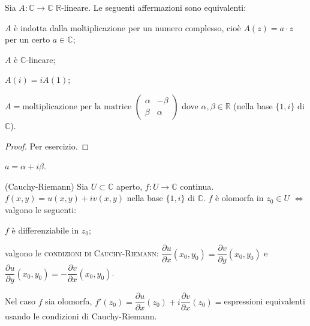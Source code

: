 \begin{lm} \label{c-lineare}
  Sia $A: \mathbb{C} \longrightarrow \mathbb{C}$ $\mathbb{R}$-lineare. Le seguenti affermazioni sono equivalenti:
  \begin{nlist}
    \item $A$ è indotta dalla moltiplicazione per un numero complesso, cioè $A(z)=a \cdot z$ per un certo $a \in \mathbb{C}$;
    \item $A$ è $\mathbb{C}$-lineare;
    \item $A(i)=iA(1)$;
    \item $A=\text{moltiplicazione per la matrice }\begin{pmatrix}
      \alpha & -\beta\\
      \beta & \alpha
  \end{pmatrix}$ dove $\alpha, \beta \in \mathbb{R}$ (nella base $\{1, i\}$ di $\mathbb{C}$).
  \end{nlist}
\end{lm}

\begin{proof}
  Per esercizio.
\end{proof}

\begin{oss}
  $a=\alpha+i\beta$.
\end{oss}

\begin{thm}
  (Cauchy-Riemann) Sia $U \subset \mathbb{C}$ aperto, $f:U \longrightarrow \mathbb{C}$ continua. $f(x, y)=u(x, y)+iv(x, y)$ nella base $\{1, i\}$ di $\mathbb{C}$. $f$ è olomorfa in $z_0 \in U$ $\iff$ valgono le seguenti:
  \begin{nlist}
    \item $f$ è differenziabile in $z_0$;
    \item valgono le \textsc{condizioni di Cauchy-Riemann}: $\dfrac{\partial u}{\partial x}(x_0, y_0)=\dfrac{\partial v}{\partial y}(x_0, y_0)$ e $\dfrac{\partial u}{\partial y}(x_0, y_0)=-\dfrac{\partial v}{\partial x}(x_0, y_0)$.
  \end{nlist}
  Nel caso $f$ sia olomorfa, $f'(z_0)=\dfrac{\partial u}{\partial x}(z_0)+i\dfrac{\partial v}{\partial x}(z_0)=$espressioni equivalenti usando le condizioni di Cauchy-Riemann.
\end{thm}

